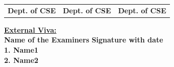 \begin{titlepage}
\begin{tabular}{l  l  l}
\textbf{Dept. of CSE} & \hspace{0.7cm}\textbf{Dept. of CSE}  & \hspace{0.7cm}\textbf{Dept. of CSE}\\[0.2in]
\end{tabular}
\textup{\underline{\textbf{External Viva:}}} \\ 
\textup{\textbf{Name of the Examiners}}\hspace{6cm} {\textbf{Signature with date}} \\[0.1in]
\textup{\textbf{1. Name1}} \\[0.4in]
\textup{\textbf{2. Name2}}
\end{titlepage}